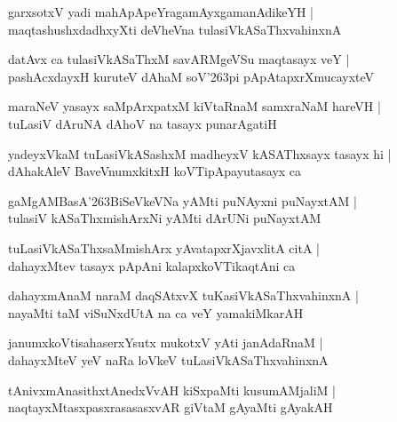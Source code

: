 \documentclass[twoside,12pt,openright]{book}
\def\S{\char'263}
\newcounter{shloka}[chapter]
\begin{document}
\begin{shloka}%
garxsotxV yadi mahApApeYragamAyxgamanAdikeYH |\\
maqtashushxdadhxyXti deVheVna tulasiVkASaThxvahinxnA 
\end{shloka}

\begin{shloka}%
datAvx ca tulasiVkASaThxM savARMgeVSu maqtasayx veY |\\
pashAcxdayxH kuruteV dAhaM soV\S pi pApAtapxrXmucayxteV 
\end{shloka}

\begin{shloka}%
maraNeV yasayx saMpArxpatxM kiVtaRnaM samxraNaM hareVH |\\
tuLasiV dAruNA dAhoV na tasayx punarAgatiH
\end{shloka}

\begin{shloka}%
yadeyxVkaM tuLasiVkASashxM madheyxV kASAThxsayx tasayx hi |\\
dAhakAleV BaveVnumxkitxH koVTipApayutasayx ca 
\end{shloka}

\begin{shloka}%
gaMgAMBasA\S BiSeVkeVNa yAMti puNAyxni puNayxtAM |\\
tulasiV kASaThxmishArxNi yAMti dArUNi puNayxtAM 
\end{shloka}

\begin{shloka}%
tuLasiVkASaThxsaMmishArx yAvatapxrXjavxlitA citA |\\
dahayxMtev tasayx pApAni kalapxkoVTikaqtAni ca 
\end{shloka}

\begin{shloka}%
dahayxmAnaM naraM daqSAtxvX tuKasiVkASaThxvahinxnA |\\
nayaMti taM viSuNxdUtA na ca veY yamakiMkarAH 
\end{shloka}

\begin{shloka}%
janumxkoVtisahaserxYsutx mukotxV yAti janAdaRnaM |\\
dahayxMteV yeV naRa loVkeV tuLasiVkASaThxvahinxnA
\end{shloka}

\begin{shloka}%
tAnivxmAnasithxtAnedxVvAH kiSxpaMti kusumAMjaliM |\\
naqtayxMtasxpasxrasasasxvAR giVtaM gAyaMti gAyakAH
\end{shloka}
\end{document}
